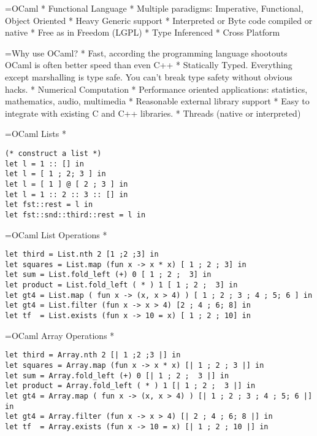 \documentclass[titlepage,usenames,a4,landscape,semhelv]{seminar}
\title{\gettitle}
\author{Abram Hindle\\
Kitchener Waterloo Perl Monger \\
http://kw.pm.org\\
abez@abez.ca
} \date{\today}
\begin{document}
\pagestyle{fancy} %
\begin{slide}
\maketitle

=OCaml
* Functional Language
* Multiple paradigms: Imperative, Functional, Object Oriented
* Heavy Generic support
* Interpreted or Byte code compiled or native
* Free as in Freedom (LGPL)
* Type Inferenced
* Cross Platform

=Why use OCaml?
* Fast, according the programming language shootouts OCaml is often better speed than even C++
* Statically Typed. Everything except marshalling is type safe. You can't break type safety without obvious hacks.
* Numerical Computation
* Performance oriented applications: statistics, mathematics, audio, multimedia
* Reasonable external library support
* Easy to integrate with existing C and C++ libraries.
* Threads (native or interpreted)

=OCaml Lists
*
\begin{verbatim}
(* construct a list *)
let l = 1 :: [] in
let l = [ 1 ; 2; 3 ] in
let l = [ 1 ] @ [ 2 ; 3 ] in
let l = 1 :: 2 :: 3 :: [] in
let fst::rest = l in
let fst::snd::third::rest = l in
\end{verbatim}

=OCaml List Operations
*
\begin{verbatim}
let third = List.nth 2 [1 ;2 ;3] in
let squares = List.map (fun x -> x * x) [ 1 ; 2 ; 3] in
let sum = List.fold_left (+) 0 [ 1 ; 2 ;  3] in
let product = List.fold_left ( * ) 1 [ 1 ; 2 ;  3] in
let gt4 = List.map ( fun x -> (x, x > 4) ) [ 1 ; 2 ; 3 ; 4 ; 5; 6 ] in
let gt4 = List.filter (fun x -> x > 4) [2 ; 4 ; 6; 8] in
let tf  = List.exists (fun x -> 10 = x) [ 1 ; 2 ; 10] in
\end{verbatim}

=OCaml Array Operations
*
\begin{verbatim}
let third = Array.nth 2 [| 1 ;2 ;3 |] in
let squares = Array.map (fun x -> x * x) [| 1 ; 2 ; 3 |] in
let sum = Array.fold_left (+) 0 [| 1 ; 2 ;  3 |] in
let product = Array.fold_left ( * ) 1 [| 1 ; 2 ;  3 |] in
let gt4 = Array.map ( fun x -> (x, x > 4) ) [| 1 ; 2 ; 3 ; 4 ; 5; 6 |] in
let gt4 = Array.filter (fun x -> x > 4) [| 2 ; 4 ; 6; 8 |] in
let tf  = Array.exists (fun x -> 10 = x) [| 1 ; 2 ; 10 |] in
\end{verbatim}


\end{slide}
\end{document}
